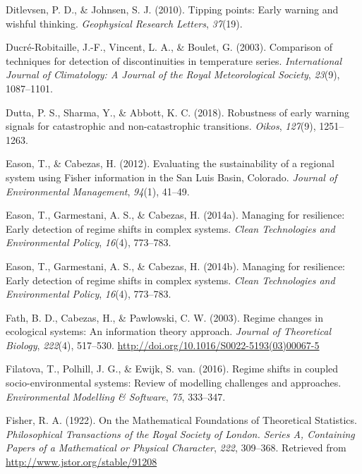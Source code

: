\documentclass[12pt,twoside,openany]{reedthesis}
\begin{document}
\leavevmode\hypertarget{ref-ditlevsen2010tipping}{}%
Ditlevsen, P. D., \& Johnsen, S. J. (2010). Tipping points: Early warning and wishful thinking. \emph{Geophysical Research Letters}, \emph{37}(19).

\leavevmode\hypertarget{ref-ducre2003comparison}{}%
Ducré-Robitaille, J.-F., Vincent, L. A., \& Boulet, G. (2003). Comparison of techniques for detection of discontinuities in temperature series. \emph{International Journal of Climatology: A Journal of the Royal Meteorological Society}, \emph{23}(9), 1087--1101.

\leavevmode\hypertarget{ref-dutta2018robustness}{}%
Dutta, P. S., Sharma, Y., \& Abbott, K. C. (2018). Robustness of early warning signals for catastrophic and non-catastrophic transitions. \emph{Oikos}, \emph{127}(9), 1251--1263.

\leavevmode\hypertarget{ref-eason_evaluating_2012}{}%
Eason, T., \& Cabezas, H. (2012). Evaluating the sustainability of a regional system using Fisher information in the San Luis Basin, Colorado. \emph{Journal of Environmental Management}, \emph{94}(1), 41--49.

\leavevmode\hypertarget{ref-eason_managing_2014}{}%
Eason, T., Garmestani, A. S., \& Cabezas, H. (2014a). Managing for resilience: Early detection of regime shifts in complex systems. \emph{Clean Technologies and Environmental Policy}, \emph{16}(4), 773--783.

\leavevmode\hypertarget{ref-eason2014managing}{}%
Eason, T., Garmestani, A. S., \& Cabezas, H. (2014b). Managing for resilience: Early detection of regime shifts in complex systems. \emph{Clean Technologies and Environmental Policy}, \emph{16}(4), 773--783.

\leavevmode\hypertarget{ref-fath_regime_2003}{}%
Fath, B. D., Cabezas, H., \& Pawlowski, C. W. (2003). Regime changes in ecological systems: An information theory approach. \emph{Journal of Theoretical Biology}, \emph{222}(4), 517--530. \url{http://doi.org/10.1016/S0022-5193(03)00067-5}

\leavevmode\hypertarget{ref-filatova2016regime}{}%
Filatova, T., Polhill, J. G., \& Ewijk, S. van. (2016). Regime shifts in coupled socio-environmental systems: Review of modelling challenges and approaches. \emph{Environmental Modelling \& Software}, \emph{75}, 333--347.

\leavevmode\hypertarget{ref-fisher_mathematical_1922}{}%
Fisher, R. A. (1922). On the Mathematical Foundations of Theoretical Statistics. \emph{Philosophical Transactions of the Royal Society of London. Series A, Containing Papers of a Mathematical or Physical Character}, \emph{222}, 309--368. Retrieved from \url{http://www.jstor.org/stable/91208}
\end{document}
